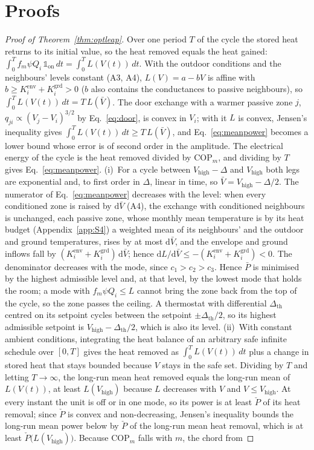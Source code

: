 \documentclass[10pt,a4paper,twocolumn]{article}
\theoremstyle{definition}
\begin{document}
\section{Proofs}\label{app:proofs}
\begin{proof}[Proof of Theorem~\ref{thm:optleap}]
Over one period $T$ of the cycle the stored heat returns to its initial value, so the heat removed equals the heat gained: $\int_0^Tf_m\psi Q_i\,\mathbb{1}_{\text{on}}\,dt=\int_0^TL(V(t))\,dt$. With the outdoor conditions and the neighbours' levels constant (A3, A4), $L(V)=a-bV$ is affine with $b\ge K^{\mathrm{env}}_i+K^{\mathrm{grd}}_i>0$ ($b$ also contains the conductances to passive neighbours), so $\int_0^TL(V(t))\,dt=T\,L(\bar V)$. The door exchange with a warmer passive zone $j$, $q_{ji}\propto(V_j-V_i)^{3/2}$ by Eq.~\eqref{eq:door}, is convex in $V_i$; with it $L$ is convex, Jensen's inequality gives $\int_0^TL(V(t))\,dt\ge T\,L(\bar V)$, and Eq.~\eqref{eq:meanpower} becomes a lower bound whose error is of second order in the amplitude. The electrical energy of the cycle is the heat removed divided by $\mathrm{COP}_m$, and dividing by $T$ gives Eq.~\eqref{eq:meanpower}. (i)~For a cycle between $V_{\text{high}}-\Delta$ and $V_{\text{high}}$ both legs are exponential and, to first order in $\Delta$, linear in time, so $\bar V=V_{\text{high}}-\Delta/2$. The numerator of Eq.~\eqref{eq:meanpower} decreases with the level: when every conditioned zone is raised by $\mathrm{d}\bar V$ (A4), the exchange with conditioned neighbours is unchanged, each passive zone, whose monthly mean temperature is by its heat budget (Appendix~\ref{app:S4}) a weighted mean of its neighbours' and the outdoor and ground temperatures, rises by at most $\mathrm{d}\bar V$, and the envelope and ground inflows fall by $(K^{\mathrm{env}}_i+K^{\mathrm{grd}}_i)\,\mathrm{d}\bar V$; hence $\mathrm{d}L/\mathrm{d}\bar V\le-(K^{\mathrm{env}}_i+K^{\mathrm{grd}}_i)<0$. The denominator decreases with the mode, since $c_1>c_2>c_3$. Hence $\bar P$ is minimised by the highest admissible level and, at that level, by the lowest mode that holds the room; a mode with $f_m\psi Q_i\le L$ cannot bring the zone back from the top of the cycle, so the zone passes the ceiling. A thermostat with differential $\Delta_{\text{th}}$ centred on its setpoint cycles between the setpoint $\pm\Delta_{\text{th}}/2$, so its highest admissible setpoint is $V_{\text{high}}-\Delta_{\text{th}}/2$, which is also its level. (ii)~With constant ambient conditions, integrating the heat balance of an arbitrary safe infinite schedule over $[0,T]$ gives the heat removed as $\int_0^TL(V(t))\,dt$ plus a change in stored heat that stays bounded because $V$ stays in the safe set. Dividing by $T$ and letting $T\to\infty$, the long-run mean heat removed equals the long-run mean of $L(V(t))$, at least $L(V_{\text{high}})$ because $L$ decreases with $V$ and $V\le V_{\text{high}}$. At every instant the unit is off or in one mode, so its power is at least $\check P$ of its heat removal; since $\check P$ is convex and non-decreasing, Jensen's inequality bounds the long-run mean power below by $\check P$ of the long-run mean heat removal, which is at least $\check P\bigl(L(V_{\text{high}})\bigr)$. Because $\mathrm{COP}_m$ falls with $m$, the chord from 
\end{proof}
\end{document}
